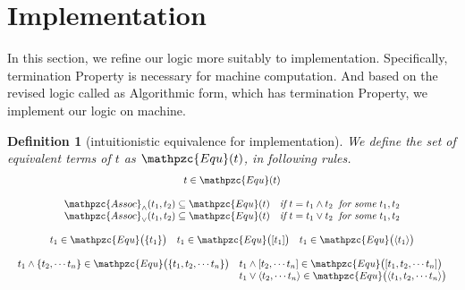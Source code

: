 \documentclass[12pt]{article}
\newtheorem{Definition}{Definition}[section]
\begin{document}
\pagebreak
\section{Implementation}

In this section, we refine our logic more suitably to implementation.
Specifically, termination Property is necessary for machine computation.
And based on the revised logic called as Algorithmic form, which has
termination Property, we implement our logic on machine.

\pagebreak
\begin{Definition}[intuitionistic equivalence for implementation]
  \label{equality_for_implementation}
  We define the set of equivalent terms of $t$ as $\mathpzc{Equ}(t)$,
  in following rules.
  \begin{displaymath}
    \begin{array}{c}
      
      t \in \mathpzc{Equ}(t)  \\
      \\

      \mathpzc{Assoc}_\wedge(t_1, t_2) \subseteq
       \mathpzc{Equ}(t) \quad \text{\it if}\ t = t_1 \wedge t_2\;\;
        \text{\it for some}\ t_1, t_2 \\
      
      \mathpzc{Assoc}_\vee(t_1, t_2) \subseteq
       \mathpzc{Equ}(t) \quad \text{\it if}\  t = t_1 \vee t_2\;\;
        \text{\it for some}\ t_1, t_2  \\
      \\

      \begin{array}{lll}
        t_1 \in \mathpzc{Equ}\bigl(\{t_1\} \bigr)
        & t_1 \in \mathpzc{Equ}\bigl([t_1] \bigr)
        & t_1 \in \mathpzc{Equ}\bigl(\langle t_1 \rangle \bigr)
      \end{array}  \\
      \\

      \begin{array}{ll}
        t_1 \wedge \{t_2, \cdots t_n\} \in
        \mathpzc{Equ}\bigl(\{t_1, t_2, \cdots t_n\} \bigr)
        & t_1 \wedge [t_2, \cdots t_n] \in
        \mathpzc{Equ}\bigl([t_1, t_2, \cdots t_n] \bigr)  \\
        & t_1 \vee \langle t_2, \cdots t_n \rangle \in
        \mathpzc{Equ}\bigl(\langle t_1, t_2, \cdots t_n \rangle \bigr)
      \end{array}  \\
      \\
      

\end{array}
\end{displaymath}
\end{Definition}
\end{document}
